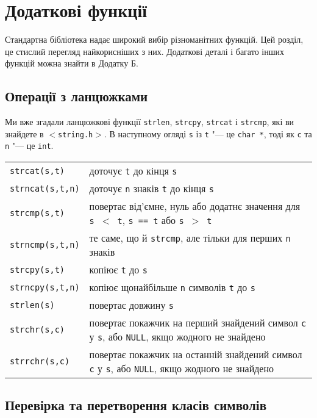 \documentclass[a4paper,12pt]{book}
\begin{document}
\section{Додаткові функції}


  Стандартна бібліотека надає широкий вибір різноманітних функцій. Цей розділ, це
  стислий перегляд найкорисніших з них. Додаткові деталі і багато інших функцій можна
  знайти в Додатку Б.

\subsection{Операції з ланцюжками}


  Ми вже згадали ланцюжкові функції \texttt{strlen}, \texttt{strcpy}, \texttt{strcat} і
  \texttt{strcmp}, які ви знайдете в \texttt{\mbox{$<$}string.h\mbox{$>$}}. В наступному огляді
  \texttt{s} із \texttt{t} "--- це \texttt{char *}, тоді як \texttt{c} та \texttt{n}
  "--- це \texttt{int}.

  \begin{center}
  \begin{tabular}{lp{12cm}}
  \texttt{strcat(s,t)} & доточує \texttt{t} до кінця \texttt{s} \\
  \texttt{strncat(s,t,n)} & доточує \texttt{n} знаків \texttt{t} до кінця \texttt{s} \\
  \texttt{strcmp(s,t)} & повертає від'ємне, нуль або додатнє значення для
  \texttt{s \mbox{$<$} t}, \texttt{s == t} або \texttt{s \mbox{$>$} t} \\
  \texttt{strncmp(s,t,n)} & те саме, що й \texttt{strcmp}, але тільки для перших
  \texttt{n} знаків \\
  \texttt{strcpy(s,t)} & копіює \texttt{t} до \texttt{s} \\
  \texttt{strncpy(s,t,n)} & копіює щонайбільше \texttt{n} символів \texttt{t} до
  \texttt{s} \\
  \texttt{strlen(s)} & повертає довжину \texttt{s} \\
  \texttt{strchr(s,c)} & повертає покажчик на перший знайдений символ \texttt{c} у
  \texttt{s}, або \texttt{NULL}, якщо жодного не знайдено \\
  \texttt{strrchr(s,c)} & повертає покажчик на останній знайдений символ \texttt{c} у
  \texttt{s}, або \texttt{NULL}, якщо жодного не знайдено \\
  \end{tabular}
  \end{center}


\subsection{Перевірка та перетворення класів символів}
\end{document}

